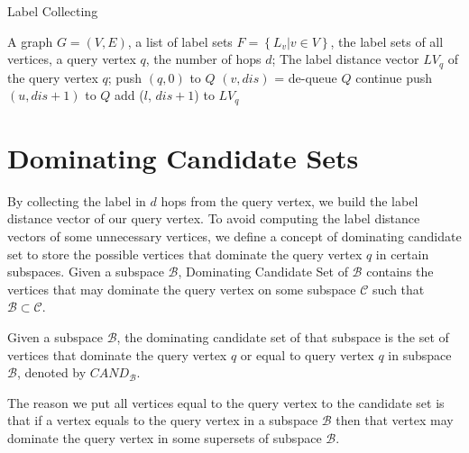 \begin{algorithm}[H]
  \caption{Label Collecting}
  \label{algo:graph_collect}
  \begin{algorithmic}[1]
  \show\LOOP
    \REQUIRE A graph $G=(V,E)$, a list of label sets $F=\left\{L_v | v \in V\right\}$, the label sets of all vertices, a query vertex $q$, the number of hops $d$;
    \ENSURE The label distance vector $LV_q$ of the query vertex $q$;
    \STATE push $\left(q, 0\right)$ to $Q$
        \STATE $\left( v, dis\right)$ = de-queue $Q$
            \STATE continue
        \ENDIF
            \STATE push $\left(u, dis+1\right)$ to $Q$
                    \STATE add ($l$, $dis+1$) to $LV_q$
                \ENDIF
            \ENDFOR
        \ENDFOR
    \ENDWHILE
  \end{algorithmic}
\end{algorithm}

\section{Dominating Candidate Sets}
\label{sec:dom-cand}

By collecting the label in $d$ hops from the query vertex, we build the label distance vector of our query vertex. To avoid computing the label distance vectors of some unnecessary vertices, we define a concept of dominating candidate set to store the possible vertices that dominate the query vertex $q$ in certain subspaces. Given a subspace $\mathcal{B}$, Dominating Candidate Set of $\mathcal{B}$ contains the vertices that may dominate the query vertex on some subspace $\mathcal{C}$ such that $\mathcal{B} \subset \mathcal{C}$.

\begin{definition}
Given a subspace $\mathcal{B}$, the dominating candidate set of that subspace is the set of vertices that dominate the query vertex $q$ or equal to query vertex $q$ in subspace $\mathcal{B}$, denoted by $\mathit{CAND}_\mathcal{B}$.
\end{definition}

The reason we put all vertices equal to the query vertex to the candidate set is that if a vertex equals to the query vertex in a subspace $\mathcal{B}$ then that vertex may dominate the query vertex in some supersets of subspace $\mathcal{B}$. 

